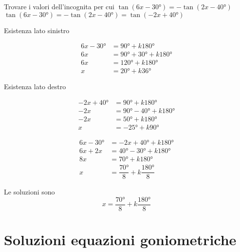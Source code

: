 \begin{exercise}
	Trovare i valori dell'incognita per cui $\tan(6x-\ang{30;;})=-\tan(2x-\ang{40;;})$
	\tcblower
	 $\tan(6x-\ang{30;;})=-\tan(2x-\ang{40;;})=\tan(-2x+\ang{40;;})$
	
	Esistenza lato sinistro
	
	\begin{align*}
		6x-\ang{30;;}&=\ang{90;;}+k\ang{180;;}\\
		6x&=\ang{90;;}+\ang{30;;}+k\ang{180;;}\\
		6x&=\ang{120;;}+k\ang{180;;}\\
		x&=\ang{20;;}+k\ang{36;;}
		\end{align*}
	
	Esistenza lato destro
	
	\begin{align*}
		-2x+\ang{40;;}&=\ang{90;;}+k\ang{180;;}\\
		-2x&=\ang{90;;}-\ang{40;;}+k\ang{180;;}\\
		-2x&=\ang{50;;}+k\ang{180;;}\\
		x&=-\ang{25;;}+k\ang{90;;}
		\end{align*}
	
	
	\begin{align*}
		6x-\ang{30;;}&=-2x+\ang{40;;}+k\ang{180;;}\\
		6x+2x&=\ang{40;;}-\ang{30;;}+k\ang{180;;}\\
		8x&=\ang{70;;}+k\ang{180;;}\\
		x&=\dfrac{\ang{70;;}}{8}+k\dfrac{\ang{180;;}}{8}
		\end{align*}
	
	Le soluzioni sono
	\[x=\dfrac{\ang{70;;}}{8}+k\dfrac{\ang{180;;}}{8}\]
\end{exercise}

 \tcbstoprecording
 \newpage
 \section{Soluzioni equazioni goniometriche}
 \tcbinputrecords